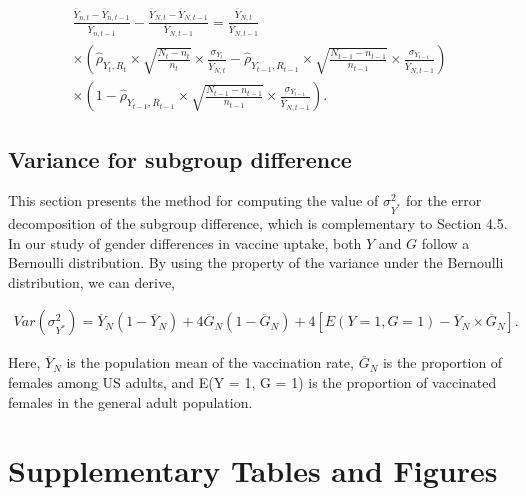 \documentclass{article}
\begin{document}
\begin{align*}
    \frac{\overline{Y}_{n,t} - \overline{Y}_{n,t-1}}{\overline{Y}_{n,t-1}} - \frac{\overline{Y}_{N,t} - \overline{Y}_{N,t-1}}{\overline{Y}_{N,t-1}} = \frac{\overline{Y}_{N,t}}{\overline{Y}_{N,t-1}} \\
    \times \left(\hat{\rho}_{Y_t, R_t} \times \sqrt{\frac{N_t - n_t}{n_t}} \times \frac{\sigma_{Y_t}}{\overline{Y}_{N,t}} - \hat{\rho}_{Y_{t-1}, R_{t-1}} \times \sqrt{\frac{N_{t-1} - n_{t-1}}{n_{t-1}}} \times \frac{\sigma_{Y_{t-1}}}{\overline{Y}_{N,{t-1}}} \right) \\
\times \left(1 - \hat{\rho}_{Y_{t-1}, R_{t-1}} \times \sqrt{\frac{N_{t-1} - n_{t-1}}{n_{t-1}}} \times \frac{\sigma_{Y_{t-1}}}{\overline{Y}_{N,{t-1}}} \right).
\end{align*}

\subsection{Variance for subgroup difference}

This section presents the method for computing the value of $\sigma^2_{Y^*}$ for the error decomposition of the subgroup difference, which is complementary to Section 4.5. In our study of gender differences in vaccine uptake, both $Y$ and $G$ follow a Bernoulli distribution. By using the property of the variance under the Bernoulli distribution, we can derive,

\begin{align*}
    Var(\sigma^2_{Y^*}) = \overline{Y}_N (1 - \overline{Y}_N) + 4 \overline{G}_N (1 - \overline{G}_N) + 4[E(Y = 1, G = 1) - \overline{Y}_N \times \overline{G}_N].
\end{align*}

\noindent Here, $\overline{Y}_N$ is the population mean of the vaccination rate, $\overline{G}_N$ is the proportion of females among US adults, and E(Y = 1, G = 1) is the proportion of vaccinated females in the general adult population.

\pagebreak

\section{Supplementary Tables and Figures}
\end{document}
